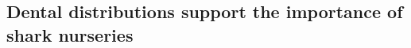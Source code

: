 \documentclass[]{rsos}%
\begin{document}
\subsection{Dental distributions support the importance of shark nurseries}
\end{document}
